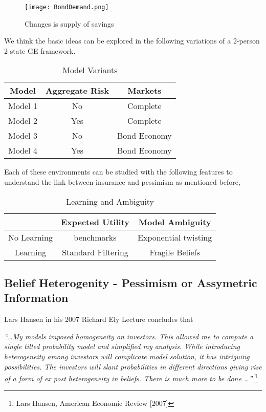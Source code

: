 \documentclass[a4paper,12pt]{article}
\begin{document}
  \begin{figure}[htb]
  \centering
  \texttt{[image: BondDemand.png]}
  \caption{Changes is supply of savings}
 \end{figure}



\noindent We think the basic ideas can be explored in the following variations of a 2-person 2 state GE framework.

\begin{table}
  \centering
  \begin{tabular}{|c | c |c |}
\hline
    Model   & Aggregate Risk & Markets \\ \hline \hline
    Model 1 & No  & Complete  \\
    Model 2 & Yes & Complete   \\
    Model 3 & No & Bond Economy  \\ 
    Model 4 & Yes & Bond Economy  \\ \hline
 \end{tabular}
  \caption{Model Variants}
  \label{tab:ModVar}
\end{table}

\noindent Each of these environments can be studied with the following features to understand the link between insurance and pessimism as mentioned before,


\begin{table}
  \centering
  \begin{tabular}{|c||c|c|}
\hline
     & Expected Utility & Model Ambiguity \\ \hline \hline
No Learning & benchmarks & Exponential twisting \\ \hline
Learning & Standard Filtering & Fragile Beliefs \\ \hline
  \end{tabular}
  \caption{Learning and Ambiguity}
  \label{tab:LearnAmb}
\end{table}

\subsection{Belief Heterogenity - Pessimism or Assymetric Information}


Lars Hansen in his 2007 Richard Ely Lecture concludes that  

\textit{``\ldots My models imposed homogeneity on investors. This allowed me to compute a single tilted probability model and simplified my analysis. While introducing heterogeneity among investors will complicate model solution, it has intriguing possibilities. The investors will slant probabilities in different directions giving rise  of a form of ex post heterogeneity in beliefs. There is much more to be done \ldots''}
\footnote{Lars Hansen, American Economic Review [2007] }
\end{document}

